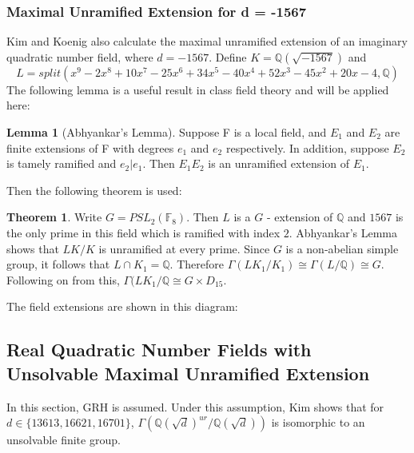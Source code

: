 \documentclass[12pt]{extarticle}
\newcommand{\Q}{\mathbb{Q}}
\newcommand{\<}{\langle}
\renewcommand{\>}{\rangle}
\theoremstyle{definition}
\newtheorem{theorem}{Theorem}
\newtheorem{lemma}{Lemma}
\begin{document}
\subsubsection*{Maximal Unramified Extension for d = -1567}
Kim and Koenig also calculate the maximal unramified extension of an imaginary quadratic number field, where $d = -1567$. 
 Define $K=\Q(\sqrt{-1567})$ and 
\begin{equation}
    L=split(x^9-2x^8+10x^7-25x^6+34x^5-40x^4+52x^3-45x^2+20x-4,\Q)
\end{equation}
The following lemma is a useful result in class field theory and will be applied here:
\begin{lemma}[Abhyankar's Lemma]
    Suppose F is a local field, and $E_1$ and $E_2$ are finite extensions of F with degrees $e_1$ and $e_2$ respectively. In addition, suppose $E_2$ is tamely ramified and $e_2|e_1$. Then $E_1E_2$ is an unramified extension of $E_1$.
 \end{lemma}
Then the following theorem is used:
\begin{theorem}
    Write $G=PSL_2(\mathbb{F}_8)$. Then $L$ is a $G$ - extension of $\Q$ and $1567$ is the only prime in this field which is ramified with index $2$. Abhyankar's Lemma shows that $LK/K$ is unramified at every prime. Since $G$ is a non-abelian simple group, it follows that $L\cap K_1=\Q$. Therefore $\Gamma(LK_1/K_1)\cong \Gamma(L/\Q)\cong G$. Following on from this, $\Gamma(LK_1/\Q \cong G \times D_{15}$. 
\end{theorem}
The field extensions are shown in this diagram:
\begin{center}
\end{center}
\subsection{Real Quadratic Number Fields with Unsolvable Maximal Unramified Extension}
In this section, GRH is assumed. Under this assumption, Kim \cite{KIM2016235} shows that for $d \in \{13613,16621,16701\}$, $\Gamma(\Q(\sqrt{d})^{ur}/\Q(\sqrt{d}))$ is isomorphic to an unsolvable finite group.
\end{document}

